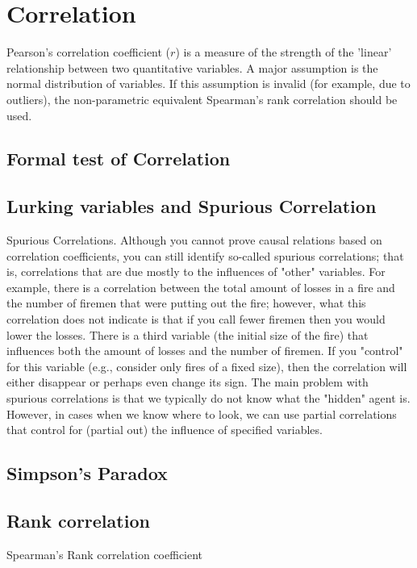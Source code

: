 
\section{Correlation}

Pearson's correlation coefficient ($r$) is a measure of the strength of the 'linear' relationship between two quantitative variables. A major assumption is the normal distribution of variables. If this assumption is invalid (for example, due to outliers), the non-parametric equivalent Spearman's rank correlation should be used.

\subsection{Formal test of Correlation}
\subsection{Lurking variables and Spurious Correlation}
Spurious Correlations. Although you cannot prove causal relations based on correlation coefficients, you can still identify so-called spurious correlations; that is, correlations that are due mostly to the influences of "other" variables. For example, there is a correlation between the total amount of losses in a fire and the number of firemen that were putting out the fire; however, what this correlation does not indicate is that if you call fewer firemen then you would lower the losses. There is a third variable (the initial size of the fire) that influences both the amount of losses and the number of firemen. If you "control" for this variable (e.g., consider only fires of a fixed size), then the correlation will either disappear or perhaps even change its sign. The main problem with spurious correlations is that we typically do not know what the "hidden" agent is. However, in cases when we know where to look, we can use partial correlations that control for (partial out) the influence of specified variables.



\subsection{Simpson's Paradox}
\subsection{Rank correlation}
Spearman's Rank correlation coefficient


